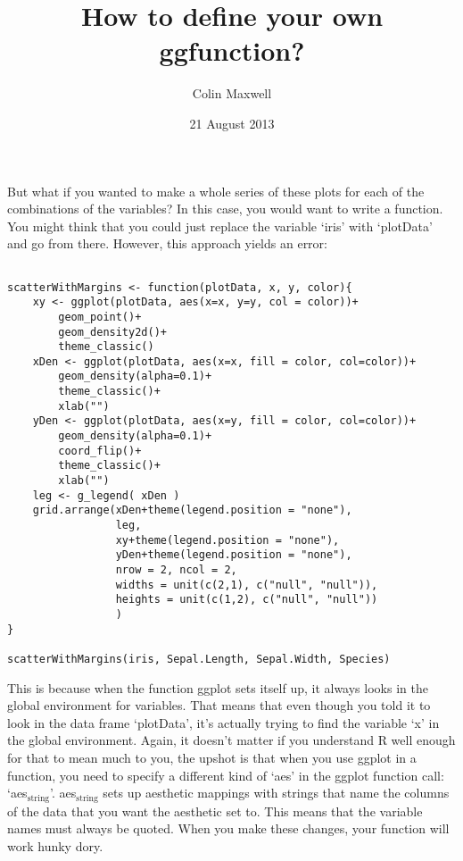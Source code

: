 \documentclass[11pt]{article}
\title{How to define your own ggfunction?}
\author{Colin Maxwell}
\date{21 August 2013}
\begin{document}
\maketitle

\setcounter{tocdepth}{3}
\tableofcontents
\vspace*{1cm}

But what if you wanted to make a whole series of these plots for each
of the combinations of the variables? In this case, you would want to
write a function. You might think that you could just replace the
variable `iris' with `plotData' and go from there. However, this
approach yields an error:

\begin{verbatim}

scatterWithMargins <- function(plotData, x, y, color){
    xy <- ggplot(plotData, aes(x=x, y=y, col = color))+
        geom_point()+
        geom_density2d()+
        theme_classic()
    xDen <- ggplot(plotData, aes(x=x, fill = color, col=color))+
        geom_density(alpha=0.1)+
        theme_classic()+
        xlab("")
    yDen <- ggplot(plotData, aes(x=y, fill = color, col=color))+
        geom_density(alpha=0.1)+
        coord_flip()+
        theme_classic()+
        xlab("")
    leg <- g_legend( xDen )
    grid.arrange(xDen+theme(legend.position = "none"),
                 leg,
                 xy+theme(legend.position = "none"),
                 yDen+theme(legend.position = "none"),
                 nrow = 2, ncol = 2,
                 widths = unit(c(2,1), c("null", "null")),
                 heights = unit(c(1,2), c("null", "null"))
                 )
}

scatterWithMargins(iris, Sepal.Length, Sepal.Width, Species)
\end{verbatim}


This is because when the function ggplot sets itself up, it always
looks in the global environment for variables. That means that even
though you told it to look in the data frame `plotData', it's actually
trying to find the variable `x' in the global environment. Again, it
doesn't matter if you understand R well enough for that to mean much
to you, the upshot is that when you use ggplot in a function, you need
to specify a different kind of `aes' in the ggplot function call:
`aes$_{\mathrm{string}}$'. aes$_{\mathrm{string}}$ sets up aesthetic mappings with strings that
name the columns of the data that you want the aesthetic set to. This
means that the variable names must always be quoted. When you make
these changes, your function will work hunky dory.
\end{document}
